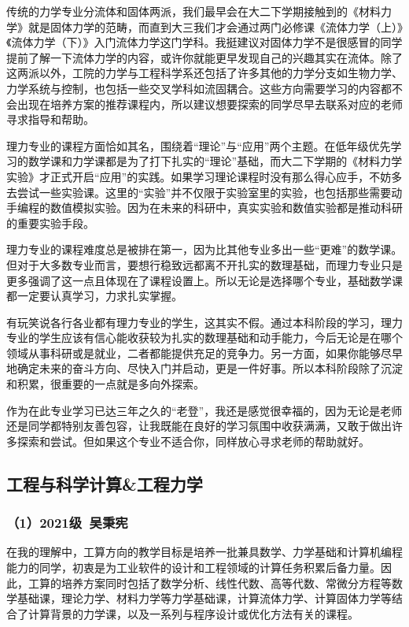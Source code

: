 \documentclass[11pt,oneside]{book}
\begin{document}
传统的力学专业分流体和固体两派，我们最早会在大二下学期接触到的《材料力学》就是固体力学的范畴，而直到大三我们才会通过两门必修课《流体力学（上）》《流体力学（下）》入门流体力学这门学科。我挺建议对固体力学不是很感冒的同学提前了解一下流体力学的内容，或许你就能更早发现自己的兴趣其实在流体。除了这两派以外，工院的力学与工程科学系还包括了许多其他的力学分支如生物力学、力学系统与控制，也包括一些交叉学科如流固耦合。这些方向需要学习的内容都不会出现在培养方案的推荐课程内，所以建议想要探索的同学尽早去联系对应的老师寻求指导和帮助。

理力专业的课程方面恰如其名，围绕着“理论”与“应用”两个主题。在低年级优先学习的数学课和力学课都是为了打下扎实的“理论”基础，而大二下学期的《材料力学实验》才正式开启“应用”的实践。如果学习理论课程时没有那么得心应手，不妨多去尝试一些实验课。这里的“实验”并不仅限于实验室里的实验，也包括那些需要动手编程的数值模拟实验。因为在未来的科研中，真实实验和数值实验都是推动科研的重要实验手段。

理力专业的课程难度总是被排在第一，因为比其他专业多出一些“更难”的数学课。但对于大多数专业而言，要想行稳致远都离不开扎实的数理基础，而理力专业只是更多强调了这一点且体现在了课程设置上。所以无论是选择哪个专业，基础数学课都一定要认真学习，力求扎实掌握。

有玩笑说各行各业都有理力专业的学生，这其实不假。通过本科阶段的学习，理力专业的学生应该有信心能收获较为扎实的数理基础和动手能力，今后无论是在哪个领域从事科研或是就业，二者都能提供充足的竞争力。另一方面，如果你能够尽早地确定未来的奋斗方向、尽快入门并启动，更是一件好事。所以本科阶段除了沉淀和积累，很重要的一点就是多向外探索。

作为在此专业学习已达三年之久的“老登”，我还是感觉很幸福的，因为无论是老师还是同学都特别友善包容，让我既能在良好的学习氛围中收获满满，又敢于做出许多探索和尝试。但如果这个专业不适合你，同样放心寻求老师的帮助就好。


\subsection{工程与科学计算\&工程力学}
\subsubsection{（1）2021级\ 吴秉宪}
            
在我的理解中，工算方向的教学目标是培养一批兼具数学、力学基础和计算机编程能力的同学，初衷是为工业软件的设计和工程领域的计算任务积累后备力量。因此，工算的培养方案同时包括了数学分析、线性代数、高等代数、常微分方程等数学基础课，理论力学、材料力学等力学基础课，计算流体力学、计算固体力学等结合了计算背景的力学课，以及一系列与程序设计或优化方法有关的课程。
\end{document}
